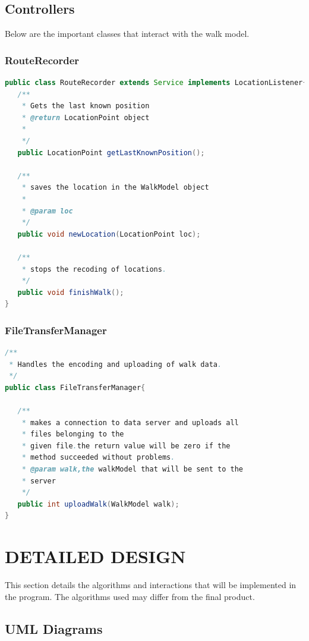 \documentclass[12pt]{article}
\begin{document}
\subsection{Controllers}
Below are the important classes that interact with the walk model.
\subsubsection{RouteRecorder}
\begin{lstlisting}[language=java]
public class RouteRecorder extends Service implements LocationListener{
   /**
   	* Gets the last known position
    * @return LocationPoint object
    * 
    */
   public LocationPoint getLastKnownPosition();

   /**
    * saves the location in the WalkModel object
    * 
    * @param loc
    */
   public void newLocation(LocationPoint loc);

   /**
    * stops the recoding of locations.
    */
   public void finishWalk();
}
\end{lstlisting}
\subsubsection{FileTransferManager}
\begin{lstlisting}[language=java]
/**
 * Handles the encoding and uploading of walk data.
 */
public class FileTransferManager{

   /**
    * makes a connection to data server and uploads all 
    * files belonging to the
    * given file.the return value will be zero if the 
    * method succeeded without problems.
    * @param walk,the walkModel that will be sent to the 
    * server
    */
   public int uploadWalk(WalkModel walk);
}
\end{lstlisting}
\section{DETAILED DESIGN}
This section details the algorithms and interactions that will be implemented in the program. The algorithms used may differ from the final product.
\subsection{UML Diagrams}
\end{document}
